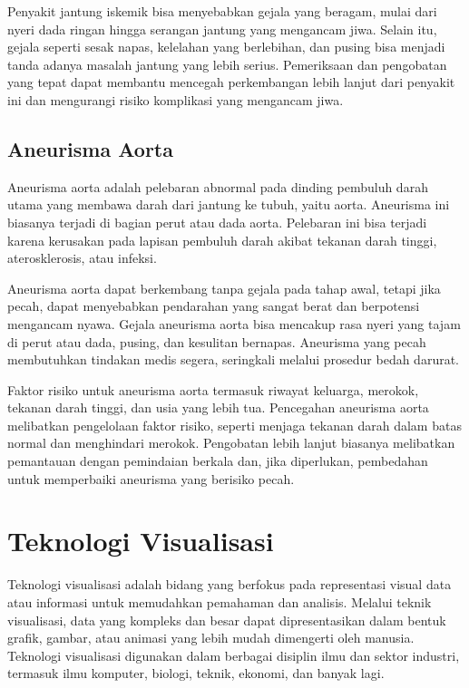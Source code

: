 Penyakit jantung iskemik bisa menyebabkan gejala yang beragam, mulai dari nyeri dada ringan hingga serangan jantung yang mengancam jiwa. Selain itu, gejala seperti sesak napas, kelelahan yang berlebihan, dan pusing bisa menjadi tanda adanya masalah jantung yang lebih serius. Pemeriksaan dan pengobatan yang tepat dapat membantu mencegah perkembangan lebih lanjut dari penyakit ini dan mengurangi risiko komplikasi yang mengancam jiwa.

\subsection{Aneurisma Aorta}
\label{subsubsec:aneurismaaorta}

Aneurisma aorta adalah pelebaran abnormal pada dinding pembuluh darah utama yang membawa darah dari jantung ke tubuh, yaitu aorta. Aneurisma ini biasanya terjadi di bagian perut atau dada aorta. Pelebaran ini bisa terjadi karena kerusakan pada lapisan pembuluh darah akibat tekanan darah tinggi, aterosklerosis, atau infeksi.

Aneurisma aorta dapat berkembang tanpa gejala pada tahap awal, tetapi jika pecah, dapat menyebabkan pendarahan yang sangat berat dan berpotensi mengancam nyawa. Gejala aneurisma aorta bisa mencakup rasa nyeri yang tajam di perut atau dada, pusing, dan kesulitan bernapas. Aneurisma yang pecah membutuhkan tindakan medis segera, seringkali melalui prosedur bedah darurat.

Faktor risiko untuk aneurisma aorta termasuk riwayat keluarga, merokok, tekanan darah tinggi, dan usia yang lebih tua. Pencegahan aneurisma aorta melibatkan pengelolaan faktor risiko, seperti menjaga tekanan darah dalam batas normal dan menghindari merokok. Pengobatan lebih lanjut biasanya melibatkan pemantauan dengan pemindaian berkala dan, jika diperlukan, pembedahan untuk memperbaiki aneurisma yang berisiko pecah.


\section{Teknologi Visualisasi}
\label{sec:visualisasi}

Teknologi visualisasi adalah bidang yang berfokus pada representasi visual data atau informasi untuk memudahkan pemahaman dan analisis. Melalui teknik visualisasi, data yang kompleks dan besar dapat dipresentasikan dalam bentuk grafik, gambar, atau animasi yang lebih mudah dimengerti oleh manusia. Teknologi visualisasi digunakan dalam berbagai disiplin ilmu dan sektor industri, termasuk ilmu komputer, biologi, teknik, ekonomi, dan banyak lagi.

